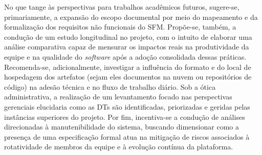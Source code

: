 No que tange às perspectivas para trabalhos acadêmicos futuros, sugere-se, primariamente, a expansão do escopo documental por meio do mapeamento e da formalização dos requisitos não funcionais do SFM. Propõe-se, também, a condução de um estudo longitudinal no projeto, com o intuito de elaborar uma análise comparativa capaz de mensurar os impactos reais na produtividade da equipe e na qualidade do \textit{software} após a adoção consolidada dessas práticas. Recomenda-se, adicionalmente, investigar a influência do formato e do local de hospedagem dos artefatos (sejam eles documentos na nuvem ou repositórios de código) na adesão técnica e no fluxo de trabalho diário. Sob a ótica administrativa, a realização de um levantamento focado nas perspectivas gerenciais elucidaria como as DTs são identificadas, priorizadas e geridas pelas instâncias superiores do projeto. Por fim, incentiva-se a condução de análises direcionadas à manutenibilidade do sistema, buscando dimensionar como a presença de uma especificação formal atua na mitigação de riscos associados à rotatividade de membros da equipe e à evolução contínua da plataforma.